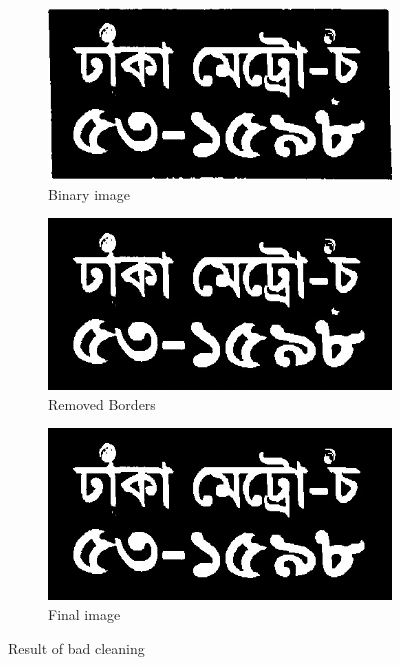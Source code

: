 \begin{figure}
\begin{subfigure}{0.33\textwidth}
    \centering
    \includegraphics[width=0.9\linewidth]{./img/experiment/stage.14/01-00-private2}
    \caption{Binary image}
\end{subfigure}
\begin{subfigure}{0.33\textwidth}
    \centering
    \includegraphics[width=0.9\linewidth]{./img/experiment/stage.15/01-00-private2}
    \caption{Removed Borders}
\end{subfigure}
\begin{subfigure}{0.33\textwidth}
    \centering
    \includegraphics[width=0.9\linewidth]{./img/experiment/stage.16/01-00-private2}
    \caption{Final image}
\end{subfigure}
\caption{Result of bad cleaning}
\label{fig:Cleaning2}
\end{figure}


